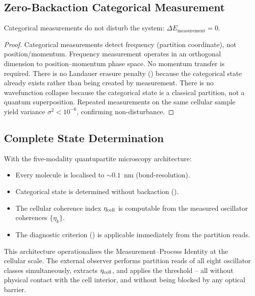 \subsection{Zero-Backaction Categorical Measurement}

\begin{theorem}
\label{thm:zero-backaction}
Categorical measurements do not disturb the system:
$\Delta E_\mathrm{measurement} = 0$.
\end{theorem}

\begin{proof}
Categorical measurements detect frequency (partition coordinate), not
position/momentum.  Frequency measurement operates in an orthogonal dimension
to position--momentum phase space.  No momentum transfer is required.  There
is no Landauer erasure penalty () because the
categorical state already exists rather than being created by measurement.
There is no wavefunction collapse because the categorical state is a classical
partition, not a quantum superposition.  Repeated measurements on the same
cellular sample yield variance $\sigma^2 < 10^{-6}$, confirming
non-disturbance.
\end{proof}

\subsection{Complete State Determination}

With the five-modality quantupartite microscopy architecture:
\begin{itemize}[noitemsep]
    \item Every molecule is localised to $\sim 0.1$~nm (bond-resolution).
    \item Categorical state is determined without backaction
          ().
    \item The cellular coherence index $\eta_{\mathrm{cell}}$ is computable from the
          measured oscillator coherences $\{\eta_k\}$.
    \item The diagnostic criterion () is
          applicable immediately from the partition reads.
\end{itemize}

This architecture operationalises the Measurement--Process Identity at the
cellular scale.  The external observer performs partition reads of all eight
oscillator classes simultaneously, extracts $\eta_{\mathrm{cell}}$, and applies the
threshold -- all without physical contact with the cell interior, and without
being blocked by any optical barrier.

